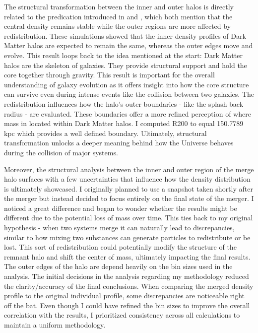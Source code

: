 \documentclass[fleqn,usenatbib]{mnras}
\begin{document}
The structural transformation between the inner and outer halos is directly related to the predication introduced in \citep{2019MNRAS.487..993D} and \citep{10.1111/j.1365-2966.2010.16912.x}, which both mention that the central density remains stable while the outer regions are more affected by redistribution. These simulations showed that the inner density profiles of Dark Matter halos are expected to remain the same, whereas the outer edges move and evolve. This result loops back to the idea mentioned at the start: Dark Matter halos are the skeleton of galaxies. They provide structural support and hold the core together through gravity. This result is important for the overall understanding of galaxy evolution as it offers insight into how the core structure can survive even during intense events like the collision between two galaxies. The redistribution influences how the halo's outer boundaries - like the splash back radius - are evaluated. These boundaries offer a more refined perception of where mass in located within Dark Matter halos. I computed R200 to equal 150.7789 kpc which provides a well defined boundary. Ultimately, structural transformation unlocks a deeper meaning behind how the Universe behaves during the collision of major systems. 

Moreover, the structural analysis between the inner and outer region of the merge halo surfaces with a few uncertainties that influence how the density distribution is ultimately showcased. I originally planned to use a snapshot taken shortly after the merger but instead decided to focus entirely on the final state of the merger. I noticed a great difference and began to wonder whether the results might be different due to the potential loss of mass over time. This ties back to my original hypothesis - when two systems merge it can naturally lead to discrepancies, similar to how mixing two substances can generate particles to redistribute or be lost. This sort of redistribution could potentially modify the structure of the remnant halo and shift the center of mass, ultimately impacting the final results. The outer edges of the halo are depend heavily on the bin sizes used in the analysis. The initial decisions in the analysis regarding my methodology reduced the clarity/accuracy of the final conclusions. When comparing the merged density profile to the original individual profile, some discrepancies are noticeable right off the bat. Even though I could have refined the bin sizes to improve the overall correlation with the results, I prioritized consistency across all calculations to maintain a uniform methodology. 
\end{document}
